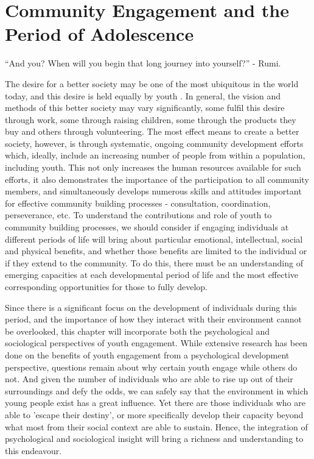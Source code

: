 \chapter{Community Engagement and the Period of Adolescence} 

\begin{bclogo}[couleur=blue!30, arrondi=0.2, logo=\bclampe]{“And you? When will you begin that long journey into yourself?”}
	 - Rumi.	
\end{bclogo}


The desire for a better society may be one of the most ubiquitous in the world today, and this desire is held equally by youth . In general, the vision and methods of this better society may vary significantly, some fulfil this desire through work, some through raising children, some through the products they buy and others through volunteering. The most effect means to create a better society, however, is through systematic, ongoing community development efforts which, ideally, include an increasing number of people from within a population, including youth. This not only increases the human resources available for such efforts, it also demonstrates the importance of the participation to all community members, and simultaneously develops numerous skills and attitudes important for effective community building processes - consultation, coordination, perseverance, etc. To understand the contributions and role of youth to community building processes, we should consider if engaging individuals at different periods of life will bring about particular emotional, intellectual, social and physical benefits, and whether those benefits are limited to the individual or if they extend to the community. To do this, there must be an understanding of emerging capacities at each developmental period of life and the most effective corresponding opportunities for those to fully develop.

Since there is a significant focus on the development of individuals during this period, and the importance of how they interact with their environment cannot be overlooked, this chapter will incorporate both the psychological and sociological perspectives of youth engagement. While extensive research has been done on the benefits of youth engagement from a psychological development perspective, questions remain about why certain youth engage while others do not. And given the number of individuals who are able to rise up out of their surroundings and defy the odds, we can safely say that the environment in which young people exist has a great influence. Yet there are those individuals who are able to 'escape their destiny', or more specifically develop their capacity beyond what most from their social context are able to sustain. Hence, the integration of psychological and sociological insight will bring a richness and understanding to this endeavour. 

